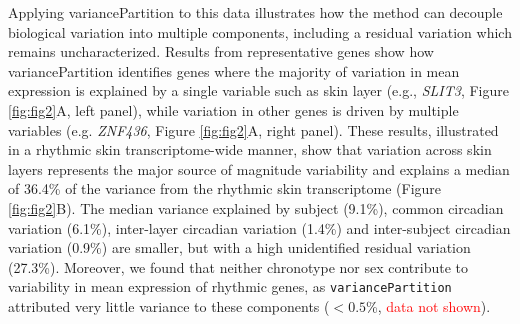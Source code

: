 Applying variancePartition to this data illustrates how the method can decouple biological variation into multiple components, including a residual variation which remains uncharacterized. Results from representative genes show how variancePartition identifies genes where the majority of variation in mean expression is explained by a single variable such as skin layer (e.g., \textit{SLIT3}, Figure \ref{fig:fig2}A, left panel), while variation in other genes is driven by multiple variables (e.g. \textit{ZNF436}, Figure \ref{fig:fig2}A, right panel). These results, illustrated in a rhythmic skin transcriptome-wide manner, show that variation across skin layers represents the major source of magnitude variability and explains a median of 36.4\% of the variance from the rhythmic skin transcriptome (Figure \ref{fig:fig2}B). The median variance explained  by subject (9.1\%), common circadian variation (6.1\%), inter-layer circadian variation (1.4\%) and inter-subject circadian variation (0.9\%) are smaller, but with a high unidentified residual variation (27.3\%). Moreover, we found that neither chronotype nor sex contribute to variability in mean expression of rhythmic genes, as \texttt{variancePartition} attributed very little variance to these components ($<0.5$\%, \textcolor{red}{data not shown}). \\

